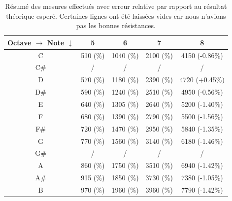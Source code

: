 \begin{table}[ht]
	\centering
		\begin{tabular}{|c|c|c|c|c|}
			\hline
				\specialcell{Octave $\rightarrow$ \\ Note $\downarrow$} & 5 & 6 & 7 & 8 \\
			\hline
				 C & \unit{510}{\milli\volt} (\%) & \unit{1040}{\milli\volt} (\%) & \unit{2100}{\milli\volt} (\%) & \unit{4150}{\milli\volt} (-0.86\%) \\
			\hline
				 C\# & / & / & / & / \\
			\hline
				 D &  \unit{570}{\milli\volt} (\%) & \unit{1180}{\milli\volt} (\%) & \unit{2390}{\milli\volt} (\%) & \unit{4720}{\milli\volt} (+0.45\%) \\
			\hline
				 D\# & \unit{590}{\milli\volt} (\%) & \unit{1240}{\milli\volt} (\%) & \unit{2510}{\milli\volt} (\%) & \unit{4950}{\milli\volt} (-0.56\%) \\
			\hline
				 E & \unit{640}{\milli\volt} (\%) & \unit{1305}{\milli\volt} (\%) & \unit{2640}{\milli\volt} (\%) & \unit{5200}{\milli\volt} (-1.40\%) \\
			\hline
				 F & \unit{680}{\milli\volt} (\%) & \unit{1390}{\milli\volt} (\%) & \unit{2790}{\milli\volt} (\%) & \unit{5500}{\milli\volt} (-1.56\%) \\
			\hline
				 F\# & \unit{720}{\milli\volt} (\%) & \unit{1470}{\milli\volt} (\%) & \unit{2950}{\milli\volt} (\%) & \unit{5840}{\milli\volt} (-1.35\%) \\
			\hline
				 G & \unit{770}{\milli\volt} (\%) & \unit{1560}{\milli\volt} (\%) & \unit{3140}{\milli\volt} (\%) & \unit{6180}{\milli\volt} (-1.46\%) \\
			\hline
				 G\# & / & / & / & / \\
			\hline
				 A & \unit{860}{\milli\volt} (\%) & \unit{1750}{\milli\volt} (\%) & \unit{3510}{\milli\volt} (\%) & \unit{6940}{\milli\volt} (-1.42\%) \\
			\hline
				 A\# & \unit{915}{\milli\volt} (\%) & \unit{1850}{\milli\volt} (\%) & \unit{3730}{\milli\volt} (\%) & \unit{7380}{\milli\volt} (-1.05\%) \\
			\hline
				 B & \unit{970}{\milli\volt} (\%) & \unit{1960}{\milli\volt} (\%) & \unit{3960}{\milli\volt} (\%) & \unit{7790}{\milli\volt} (-1.42\%) \\
			\hline
		\end{tabular}
	\caption{Résumé des mesures effectués avec erreur relative par rapport au résultat
	théorique esperé. Certaines lignes ont été laissées vides car nous n'avions pas les
	bonnes résistances.}
	\label{tab:keyboard-measure-vs-theroy}
\end{table}

